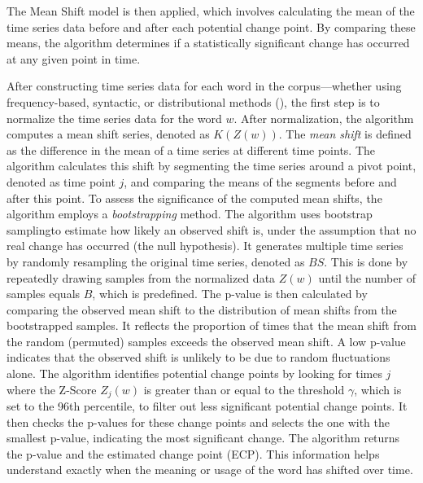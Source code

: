 The Mean Shift model is then applied, which involves calculating the mean of the time series data before and after each potential change point.
By comparing these means, the algorithm determines if a statistically significant change has occurred at any given point in time.


After constructing time series data for each word in the corpus—whether using frequency-based, syntactic, or distributional methods (), the first step is to normalize the time series data for the word $w$.
After normalization, the algorithm computes a mean shift series, denoted as $K(Z(w))$.
The \emph{mean shift} is defined as the difference in the mean of a time series at different time points.
The algorithm calculates this shift by segmenting the time series around a pivot point, denoted as time point $j$, and comparing the means of the segments before and after this point.
To assess the significance of the computed mean shifts, the algorithm employs a \emph{bootstrapping} method.
The algorithm uses bootstrap samplingto estimate how likely an observed shift is, under the assumption that no real change has occurred (the null hypothesis).
It generates multiple time series by randomly resampling the original time series, denoted as $BS$.
This is done by repeatedly drawing samples from the normalized data $Z(w)$ until the number of samples equals $B$, which is predefined.
The p-value is then calculated by comparing the observed mean shift to the distribution of mean shifts from the bootstrapped samples.
It reflects the proportion of times that the mean shift from the random (permuted) samples exceeds the observed mean shift.
A low p-value indicates that the observed shift is unlikely to be due to random fluctuations alone.
The algorithm identifies potential change points by looking for times $j$ where the Z-Score $Z_j(w)$ is greater than or equal to the threshold $\gamma$,
which is set to the 96th percentile, to filter out less significant potential change points.
It then checks the p-values for these change points and selects the one with the smallest p-value, indicating the most significant change.
The algorithm returns the p-value and the estimated change point (ECP).
This information helps understand exactly when the meaning or usage of the word has shifted over time.

